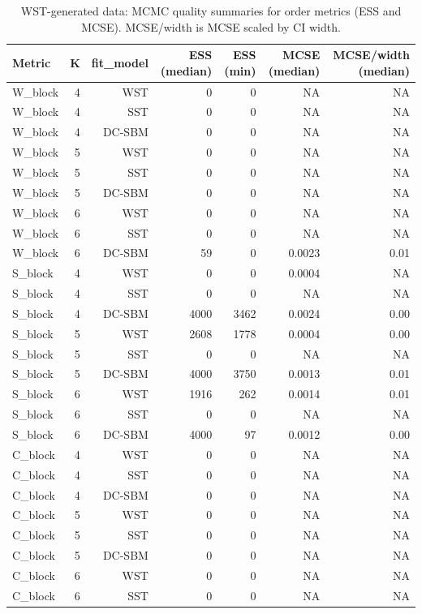 \begin{table}[!h]
\centering
\caption{WST-generated data: MCMC quality summaries for order metrics (ESS and MCSE). MCSE/width is MCSE scaled by CI width.\\\label{tab:wst-appx-mcmc-quality}}
\centering
\begin{tabular}[t]{lrrrrrr}
\toprule
Metric & K & fit_model & ESS (median) & ESS (min) & MCSE (median) & MCSE/width (median)\\
\midrule
W_block & 4 & WST & 0 & 0 & NA & NA\\
W_block & 4 & SST & 0 & 0 & NA & NA\\
W_block & 4 & DC-SBM & 0 & 0 & NA & NA\\
W_block & 5 & WST & 0 & 0 & NA & NA\\
W_block & 5 & SST & 0 & 0 & NA & NA\\
W_block & 5 & DC-SBM & 0 & 0 & NA & NA\\
W_block & 6 & WST & 0 & 0 & NA & NA\\
W_block & 6 & SST & 0 & 0 & NA & NA\\
W_block & 6 & DC-SBM & 59 & 0 & 0.0023 & 0.01\\
S_block & 4 & WST & 0 & 0 & 0.0004 & NA\\
S_block & 4 & SST & 0 & 0 & NA & NA\\
S_block & 4 & DC-SBM & 4000 & 3462 & 0.0024 & 0.00\\
S_block & 5 & WST & 2608 & 1778 & 0.0004 & 0.00\\
S_block & 5 & SST & 0 & 0 & NA & NA\\
S_block & 5 & DC-SBM & 4000 & 3750 & 0.0013 & 0.01\\
S_block & 6 & WST & 1916 & 262 & 0.0014 & 0.01\\
S_block & 6 & SST & 0 & 0 & NA & NA\\
S_block & 6 & DC-SBM & 4000 & 97 & 0.0012 & 0.00\\
C_block & 4 & WST & 0 & 0 & NA & NA\\
C_block & 4 & SST & 0 & 0 & NA & NA\\
C_block & 4 & DC-SBM & 0 & 0 & NA & NA\\
C_block & 5 & WST & 0 & 0 & NA & NA\\
C_block & 5 & SST & 0 & 0 & NA & NA\\
C_block & 5 & DC-SBM & 0 & 0 & NA & NA\\
C_block & 6 & WST & 0 & 0 & NA & NA\\
C_block & 6 & SST & 0 & 0 & NA & NA\\

\end{tabular}
\end{table}
